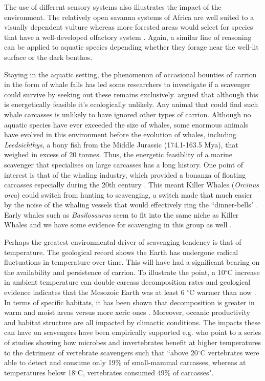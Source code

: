 \documentclass[a4paper,12pt]{article}
\begin{document}
The use of different sensory systems also illustrates the impact of the environment. 
The relatively open savanna systems of Africa are well suited to a visually dependent vulture whereas more forested areas would select for species that have a well-developed olfactory system  \citep{houston1986olfaction}. 
Again, a similar line of reasoning can be applied to aquatic species depending whether they forage near the well-lit surface or the dark benthos. 

Staying in the aquatic setting, the phenomenon of occasional bounties of carrion in the form of whale falls has led some researchers to investigate if a scavenger could survive by seeking out these remains exclusively.
\cite{ruxton2005searching} argued that although this is energetically feasible it's ecologically unlikely.
Any animal that could find such whale carcasses is unlikely to have ignored other types of carrion.
Although no aquatic species have ever exceeded the size of whales, some enormous animals have evolved in this environment before the evolution of whales, including \textit{Leedsichthys}, a bony fish from the Middle Jurassic (174.1-163.5 Mya), that weighed in excess of 20 tonnes.
Thus, the energetic feasiblity of a marine scavenger that specialises on large carcasses has a long history.
One point of interest is that of the whaling industry, which provided a bonanza of floating carcasses especially during the 20th century \citep{Whitehead415}.
This meant Killer Whales (\textit{Orcinus orca}) could switch from hunting to scavenging, a switch made that much easier by the noise of the whaling vessels that would effectively ring the ``dinner-bells" \citep{Whitehead415}.
Early whales such as \textit{Basilosaurus} seem to fit into the same niche as Killer Whales and we have some evidence for scavenging in this group as well \citep{fahlke2012bite}.

Perhaps the greatest environmental driver of scavenging tendency is that of temperature. 
The geological record shows the Earth has undergone radical fluctuations in temperature over time.
This will have had a significant bearing on the availability and persistence of carrion.
To illustrate the point, a 10$^{\circ}$C increase in ambient temperature can double carcass decomposition rates \citep{parmenter2009carrion} and geological evidence indicates that the Mesozoic Earth was at least 6 $^{\circ}$C warmer than now \citep{sellwood2006mesozoic}.
In terms of specific habitats, it has been shown that decomposition is greater in warm and moist areas versus more xeric ones \citep{beasley2015vertebrates}.
Moreover, oceanic productivity and habitat structure are all impacted by climactic conditions.
The impacts these can have on scavengers have been empirically supported e.g.
\cite{beasley2015vertebrates} who point to a series of studies showing how microbes and invertebrates benefit at higher temperatures to the detriment of vertebrate scavengers such that ``above 20$^{\circ}$C vertebrates were able to detect and consume only 19\% of small-mammal carcasses, whereas at temperatures below 18$^{\circ}$C, vertebrates consumed 49\% of carcasses".
\end{document}
